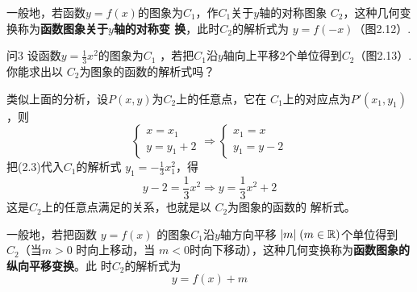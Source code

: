 一般地，若函数$y=f(x)$的图象为$C_1$，作$C_1$关于$y$轴的对称图象
$C_2$，这种几何变换称为\textbf{函数图象关于$y$轴的对称变
换}，此时$C_2$的解析式为
$y=f(-x)$（图2.12）.

\begin{thm}{问3}
设函数$y=\frac{1}{3}x^2$的图象为$C_1$
，若把$C_1$沿$y$轴向上平移2个单位得到$C_2$（图2.13）. 你能求出以
$C_2$为图象的函数的解析式吗？
\end{thm}

类似上面的分析，设$P(x,y)$为$C_2$上的任意点，它在
$C_1$上的对应点为$P'(x_1,y_1)$，则
\begin{equation}
    \begin{cases}
        x=x_1\\y=y_1+2
    \end{cases}\Longrightarrow \begin{cases}
        x_1=x\\y_1=y-2
    \end{cases}
\end{equation}
把(2.3)代入$C_1$的解析式
$y_1=-\frac{1}{3}x_1^2$，得
\[y-2=\frac{1}{3}x^2\Longrightarrow y=\frac{1}{3}x^2+2\]
这是$C_2$上的任意点满足的关系，也就是以
$C_2$为图象的函数的
解析式。

一般地，若把函数
$y=f(x)$
的图象$C_1$沿$y$轴方向平移
$|m|\; (m\in\mathbb{R})$个单位得到
$C_2$（当$m>0$
时向上移动，当
$m<0$时向下移动），这种几何变换称为\textbf{函数图象的纵向平移变换}。此
时$C_2$的解析式为
\[y=f(x)+m\]

